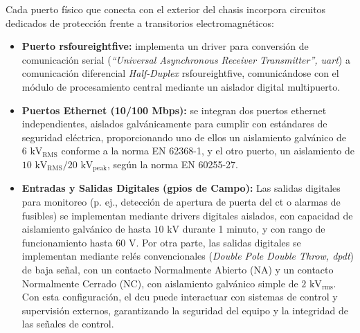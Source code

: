 Cada puerto físico que conecta con el exterior del chasis incorpora circuitos dedicados de protección frente a transitorios electromagnéticos:
\begin{itemize}
    \item \textbf{Puerto \gls{rsfoureightfive}:} implementa un driver para conversión de comunicación serial (\textit{``Universal Asynchronous Receiver Transmitter'', \gls{uart}}) a comunicación diferencial \textit{Half-Duplex} \gls{rsfoureightfive}, comunicándose con el módulo de procesamiento central mediante un aislador digital multipuerto.
        
    \item \textbf{Puertos Ethernet (10/100 Mbps):} se integran dos puertos ethernet independientes, aislados galvánicamente para cumplir con estándares de seguridad eléctrica, proporcionando uno de ellos un aislamiento galvánico de $6\text{ kV}_{\text{RMS}}$ conforme a la norma EN 62368-1, y el otro puerto, un aislamiento de $10\text{ kV}_{\text{RMS}}/20\text{ kV}_{\text{peak}}$, según la norma EN 60255-27.
        
    \item \textbf{Entradas y Salidas Digitales (\glspl{gpio} de Campo):} Las salidas digitales para monitoreo (p. ej., detección de apertura de puerta del \gls{ct} o alarmas de fusibles) se implementan mediante drivers digitales aislados, con capacidad de aislamiento galvánico de hasta $10 \text{ kV}$ durante 1 minuto, y con rango de funcionamiento hasta $60 \text{ V}$. Por otra parte, las salidas digitales se implementan mediante relés convencionales (\textit{Double Pole Double Throw, \gls{dpdt}}) de baja señal, con un contacto Normalmente Abierto (NA) y un contacto Normalmente Cerrado (NC), con aislamiento galvánico simple de $2 \text{ kV}_\text{rms}$. Con esta configuración, el \gls{dcu} puede interactuar con sistemas de control y supervisión externos, garantizando la seguridad del equipo y la integridad de las señales de control. 

\end{itemize}



